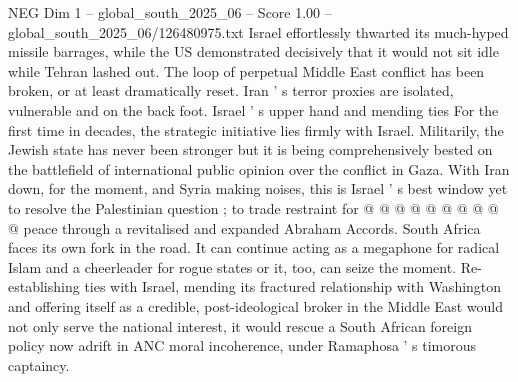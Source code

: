 \begin{textsample}{NEG Dim 1 – global\_south\_2025\_06 – Score 1.00 – global\_south\_2025\_06/126480975.txt}
Israel effortlessly thwarted its much-hyped missile barrages, while the US demonstrated decisively that it would not sit idle while Tehran lashed out.
The loop of perpetual Middle East conflict has been broken, or at least dramatically reset.
Iran ' s terror proxies are isolated, vulnerable and on the back foot.
Israel ' s upper hand and mending ties For the first time in decades, the strategic initiative lies firmly with Israel.
Militarily, the Jewish state has never been stronger but it is being comprehensively bested on the battlefield of international public opinion over the conflict in Gaza.
With Iran down, for the moment, and Syria making noises, this is Israel ' s best window yet to resolve the Palestinian question ; to trade restraint for @ @ @ @ @ @ @ @ @ @ peace through a revitalised and expanded Abraham Accords.
South Africa faces its own fork in the road.
It can continue acting as a megaphone for radical Islam and a cheerleader for rogue states or it, too, can seize the moment.
Re-establishing ties with Israel, mending its fractured relationship with Washington and offering itself as a credible, post-ideological broker in the Middle East would not only serve the national interest, it would rescue a South African foreign policy now adrift in ANC moral incoherence, under Ramaphosa ' s timorous captaincy.

\end{textsample}
